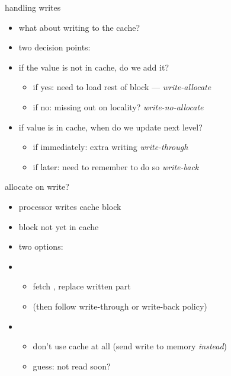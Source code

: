 \usetikzlibrary{arrows.meta,matrix,positioning,shapes.callouts,shapes.misc,fit,calc}

\begin{frame}{handling writes}
    \begin{itemize}
    \item what about writing to the cache?
    \item two decision points:
    \vspace{.5cm}
    \item if the value is not in cache, do we add it?
        \begin{itemize}
        \item if yes: need to load rest of block --- \textit{write-allocate}
        \item if no: missing out on locality? \textit{write-no-allocate}
        \end{itemize}   
    \item if value is in cache, when do we update next level?
        \begin{itemize}
        \item if immediately: extra writing \textit{write-through}
        \item if later: need to remember to do so \textit{write-back}
        \end{itemize}
    \end{itemize}
\end{frame}

\begin{frame}{allocate on write?}
\begin{itemize}
\item processor writes  cache block
\item block not yet in cache
\item two options:
\vspace{0.5cm}
\item {}
    \begin{itemize}
    \item fetch , replace written part
    \item (then follow write-through or write-back policy)
    \end{itemize}
\item {}
    \begin{itemize}
    \item don't use cache at all (send write to memory \textit{instead})
    \item guess: not read soon?
    \end{itemize}
\end{itemize}
\end{frame}

